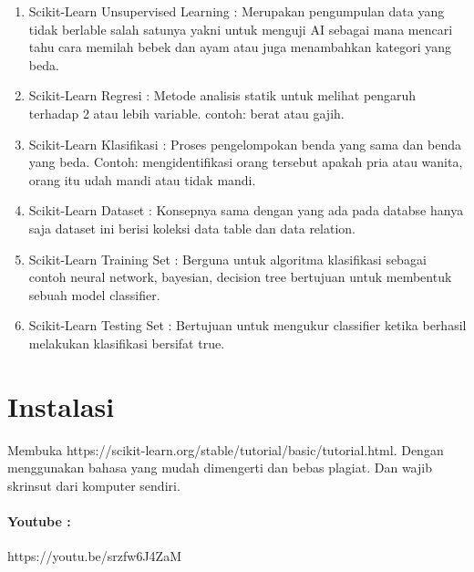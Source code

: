 \begin{enumerate}
\begin{enumerate}
              \item Scikit-Learn Unsupervised Learning : Merupakan pengumpulan data yang tidak berlable salah satunya yakni untuk menguji AI sebagai mana mencari tahu cara memilah bebek dan ayam atau juga menambahkan kategori yang beda.

              \item Scikit-Learn Regresi : Metode analisis statik untuk melihat pengaruh terhadap 2 atau lebih variable. contoh: berat atau gajih.

              \item Scikit-Learn Klasifikasi : Proses pengelompokan benda yang sama dan benda yang beda. Contoh: mengidentifikasi orang tersebut apakah pria atau wanita, orang itu udah mandi atau tidak mandi.

              \item Scikit-Learn Dataset : Konsepnya sama dengan yang ada pada databse hanya saja dataset ini berisi koleksi data table dan data relation.

              \item Scikit-Learn Training Set : Berguna untuk algoritma klasifikasi sebagai contoh neural network, bayesian, decision tree bertujuan untuk membentuk sebuah model classifier.

              \item Scikit-Learn Testing Set : Bertujuan untuk mengukur classifier ketika berhasil melakukan klasifikasi bersifat true.
          \end{enumerate}
\end{enumerate}



\section{Instalasi}
Membuka https://scikit-learn.org/stable/tutorial/basic/tutorial.html. Dengan menggunakan bahasa yang mudah dimengerti dan bebas plagiat.
Dan wajib skrinsut dari komputer sendiri.

\paragraph{\textbf Youtube :} https://youtu.be/srzfw6J4ZaM

